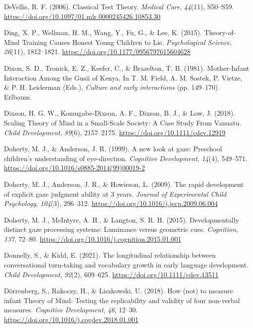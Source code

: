 \documentclass[
]{scrbook}
\newlength{\cslhangindent}
\newenvironment{CSLReferences}[2] %
 {\begin{list}{}{%
  \setlength{\itemindent}{0pt}
  \setlength{\leftmargin}{0pt}
  \setlength{\parsep}{0pt}
  \ifodd #1
   \setlength{\leftmargin}{\cslhangindent}
   \setlength{\itemindent}{-1\cslhangindent}
  \fi
  \setlength{\itemsep}{#2\baselineskip}}}
 {\end{list}}
\begin{document}
\begin{CSLReferences}{1}{0}
DeVellis, R. F. (2006). Classical {Test Theory}. \emph{Medical Care}, \emph{44}(11), S50--S59. \url{https://doi.org/10.1097/01.mlr.0000245426.10853.30}

Ding, X. P., Wellman, H. M., Wang, Y., Fu, G., \& Lee, K. (2015). Theory-of-{Mind Training Causes Honest Young Children} to {Lie}. \emph{Psychological Science}, \emph{26}(11), 1812--1821. \url{https://doi.org/10.1177/0956797615604628}

Dixon, S. D., Tronick, E. Z., Keefer, C., \& Brazelton, T. B. (1981). Mother-{Infant Interaction Among} the {Gusii} of {Kenya}. In T. M. Field, A. M. Sostek, P. Vietze, \& P. H. Leiderman (Eds.), \emph{Culture and early interactions} (pp. 149--170). Erlbaum.

Dixson, H. G. W., Komugabe-Dixson, A. F., Dixson, B. J., \& Low, J. (2018). Scaling {Theory} of {Mind} in a {Small-Scale Society}: {A Case Study From Vanuatu}. \emph{Child Development}, \emph{89}(6), 2157--2175. \url{https://doi.org/10.1111/cdev.12919}

Doherty, M. J., \& Anderson, J. R. (1999). A new look at gaze: {Preschool} children's understanding of eye-direction. \emph{Cognitive Development}, \emph{14}(4), 549--571. \url{https://doi.org/10.1016/s0885-2014(99)00019-2}

Doherty, M. J., Anderson, J. R., \& Howieson, L. (2009). The rapid development of explicit gaze judgment ability at 3 years. \emph{Journal of Experimental Child Psychology}, \emph{104}(3), 296--312. \url{https://doi.org/10.1016/j.jecp.2009.06.004}

Doherty, M. J., McIntyre, A. H., \& Langton, S. R. H. (2015). Developmentally distinct gaze processing systems: {Luminance} versus geometric cues. \emph{Cognition}, \emph{137}, 72--80. \url{https://doi.org/10.1016/j.cognition.2015.01.001}

Donnelly, S., \& Kidd, E. (2021). The longitudinal relationship between conversational turn-taking and vocabulary growth in early language development. \emph{Child Development}, \emph{92}(2), 609--625. \url{https://doi.org/10.1111/cdev.13511}

Dörrenberg, S., Rakoczy, H., \& Liszkowski, U. (2018). How (not) to measure infant {Theory} of {Mind}: {Testing} the replicability and validity of four non-verbal measures. \emph{Cognitive Development}, \emph{46}, 12--30. \url{https://doi.org/10.1016/j.cogdev.2018.01.001}


\end{CSLReferences}
\end{document}

